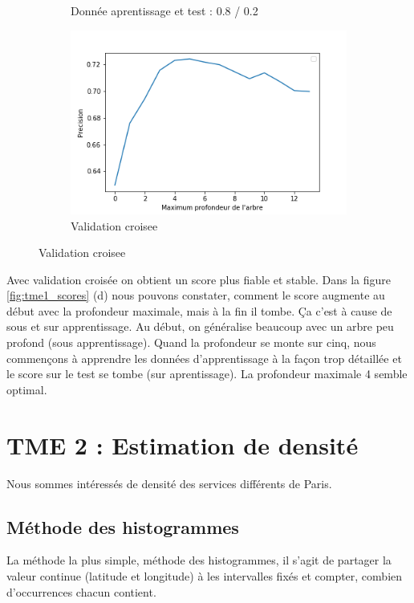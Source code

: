 \documentclass[a4paper,12pt]{article}
\begin{document}
\begin{figure}[h!]
\begin{subfigure}{.5\textwidth}
	\caption{Donnée aprentissage et test : 0.8 / 0.2}
\end{subfigure}
\begin{subfigure}{.5\textwidth}
  \centering
	\label{fig:partition_vc}
	\includegraphics[width=0.8\linewidth]{images/tme1/partition_vc.png}
	\caption{Validation croisee}
\end{subfigure}
\end{figure}

Avec validation croisée on obtient un score plus fiable et stable.
Dans la figure \autoref{fig:tme1_scores} (d) nous pouvons constater, comment le score augmente au début avec la profondeur maximale, mais à la fin il tombe.
Ça c'est à cause de sous et sur apprentissage.
Au début, on généralise beaucoup avec un arbre peu profond (sous apprentissage).
Quand la profondeur se monte sur cinq,
nous commençons à apprendre les données d'apprentissage à la façon trop détaillée et le score sur le test se tombe (sur aprentissage).
La profondeur maximale 4 semble optimal.

\section{TME 2 : Estimation de densité}

Nous sommes intéressés de densité des services différents de Paris.

\subsection{Méthode des histogrammes}

La méthode la plus simple, méthode des histogrammes, il s'agit de partager la valeur continue (latitude et longitude)
à les intervalles fixés et compter, combien d'occurrences chacun contient.
\end{document}
